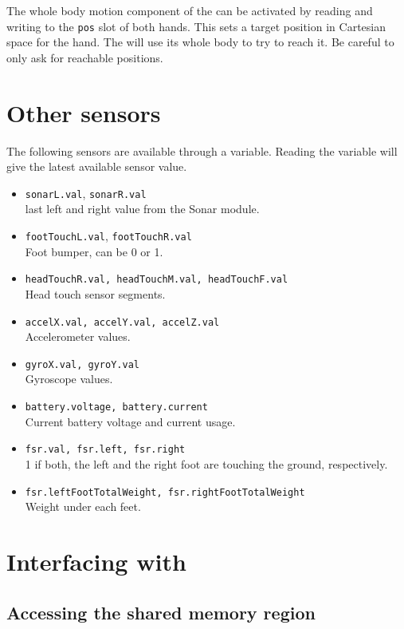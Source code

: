 The whole body motion component of the \naoqi can be activated by reading and
writing to the \lstinline|pos| slot of both hands. This sets a target
position in Cartesian space for the hand. The \naoqi will use its whole body
to try to reach it. Be careful to only ask for reachable positions.

\section{Other sensors}

The following sensors are available through a \us variable.
Reading the variable will give the latest available sensor value.

\begin{itemize}
\item \lstinline|sonarL.val|, \lstinline|sonarR.val| \\
    last left and right value from the Sonar module.
\item \lstinline|footTouchL.val|, \lstinline|footTouchR.val| \\
    Foot bumper, can be 0 or 1.
\item \lstinline|headTouchR.val, headTouchM.val, headTouchF.val| \\
    Head touch sensor segments.
\item \lstinline|accelX.val, accelY.val, accelZ.val| \\
    Accelerometer values.
\item \lstinline|gyroX.val, gyroY.val| \\
    Gyroscope values.
\item \lstinline|battery.voltage, battery.current| \\
    Current battery voltage and current usage.
\item \lstinline|fsr.val, fsr.left, fsr.right| \\
    1 if both, the left and the right foot are touching the ground, respectively.
\item \lstinline|fsr.leftFootTotalWeight, fsr.rightFootTotalWeight| \\
    Weight under each feet.
\end{itemize}

\section{Interfacing with \naoqi}

\subsection{Accessing the \naoqi shared memory region}

